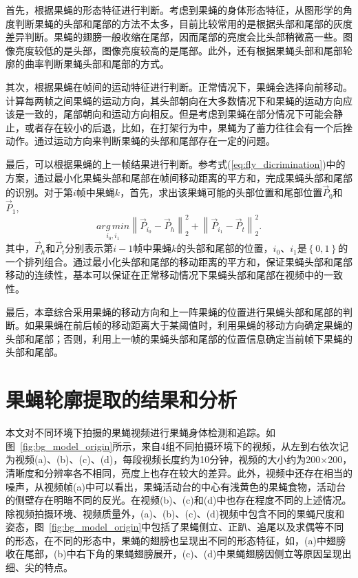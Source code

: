 首先，根据果蝇的形态特征进行判断。考虑到果蝇的身体形态特征，从图形学的角度判断果蝇的头部和尾部的方法不太多，目前比较常用的是根据头部和尾部的灰度差异判断。果蝇的翅膀一般收缩在尾部，因而尾部的亮度会比头部稍微高一些。图像亮度较低的是头部，图像亮度较高的是尾部。此外，还有根据果蝇头部和尾部轮廓的曲率判断果蝇头部和尾部的方式。

其次，根据果蝇在帧间的运动特征进行判断。正常情况下，果蝇会选择向前移动。计算每两帧之间果蝇的运动方向，其头部朝向在大多数情况下和果蝇的运动方向应该是一致的，尾部朝向和运动方向相反。但是考虑到果蝇在部分情况下可能会静止，或者存在较小的后退，比如，在打架行为中，果蝇为了蓄力往往会有一个后挫动作。通过运动方向来判断果蝇的头部和尾部存在一定的问题。

最后，可以根据果蝇的上一帧结果进行判断。参考式(\ref{eq:fly_dicrimination})中的方案，通过最小化果蝇头部和尾部在帧间移动距离的平方和，完成果蝇头部和尾部的识别。对于第$i$帧中果蝇$k$，首先，求出该果蝇可能的头部位置和尾部位置$\vec{P}_{0}$和$\vec{P}_{1}$,
\begin{equation}\label{eq:fly_head_tail_dist}
\underset{i_0, i_1}{arg\,min} \left\|\vec{P}_{i_0} - \vec{P}_{h}\right\|_2^2 + \left\|\vec{P}_{i_1} - \vec{P}_{t}\right\|_2^2.
\end{equation}
其中，$\vec{P}_{h}$和$\vec{P}_{t}$分别表示第$i-1$帧中果蝇$k$的头部和尾部的位置，$i_0$、$i_1$是$\left\{0, 1\right\}$的一个排列组合。通过最小化头部和尾部的移动距离的平方和，保证果蝇头部和尾部移动的连续性，基本可以保证在正常移动情况下果蝇头部和尾部在视频中的一致性。

最后，本章综合采用果蝇的移动方向和上一阵果蝇的位置进行果蝇头部和尾部的判断。如果果蝇在前后帧的移动距离大于某阈值时，利用果蝇的移动方向确定果蝇的头部和尾部；否则，利用上一帧的果蝇头部和尾部的位置信息确定当前帧下果蝇的头部和尾部。


\section{果蝇轮廓提取的结果和分析}\label{sec:chap4_experiments}

本文对不同环境下拍摄的果蝇视频进行果蝇身体检测和追踪。如图~\ref{fig:bg_model_origin}所示，来自4组不同拍摄环境下的视频，从左到右依次记为视频(a)、(b)、(c)、(d)，每段视频长度约为10分钟，视频的大小约为200$\times$200，清晰度和分辨率各不相同，亮度上也存在较大的差异。此外，视频中还存在相当的噪声，从视频帧(a)中可以看出，果蝇活动台的中心有浅黄色的果蝇食物，活动台的侧壁存在明暗不同的反光。在视频(b)、(c)和(d)中也存在程度不同的上述情况。除视频拍摄环境、视频质量外，(a)、(b)、(c)、(d)视频中包含不同的果蝇尺度和姿态，图~\ref{fig:bg_model_origin}中包括了果蝇侧立、正趴、追尾以及求偶等不同的形态，在不同的形态中，果蝇的翅膀也呈现出不同的形态特征，如，(a)中翅膀收在尾部，(b)中右下角的果蝇翅膀展开，(c)、(d)中果蝇翅膀因侧立等原因呈现出细、尖的特点。

